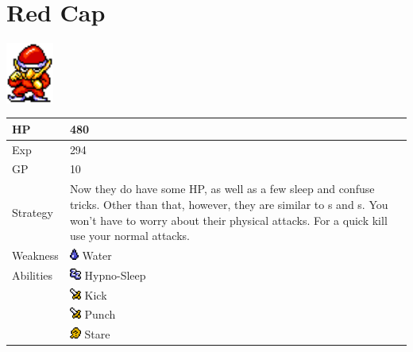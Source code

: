 \section{Red Cap}
\label{monster:red_cap}

\includegraphics[height=2cm,keepaspectratio]{./resources/monster/red_cap}

\begin{longtable}{ l p{9cm} }
	HP
	& 480
\\ \hline
	Exp
	& 294
\\ \hline
	GP
	& 10
\\ \hline
	Strategy
	& Now they do have some HP, as well as a few sleep and confuse tricks. Other than that, however, they are similar to \nameref{monster:mint_mint}s and \nameref{monster:brownie}s. You won't have to worry about their physical attacks. For a quick kill use your normal attacks.
\\ \hline
	Weakness
	& \includegraphics[height=1em,keepaspectratio]{./resources/effects/water} Water
\\ \hline
	Abilities
	& \includegraphics[height=1em,keepaspectratio]{./resources/effects/sleep} Hypno-Sleep \\
	& \includegraphics[height=1em,keepaspectratio]{./resources/effects/damage} Kick \\
	& \includegraphics[height=1em,keepaspectratio]{./resources/effects/damage} Punch \\
	& \includegraphics[height=1em,keepaspectratio]{./resources/effects/confusion} Stare
\end{longtable}
